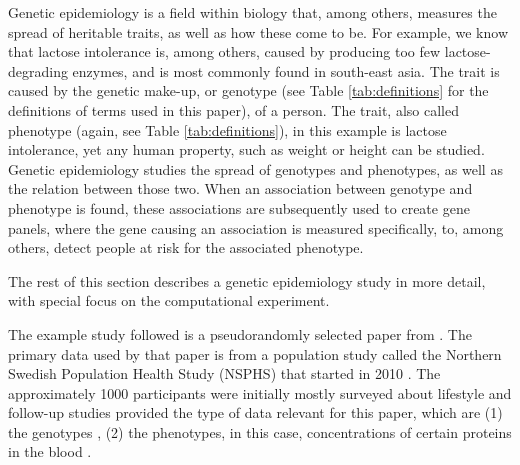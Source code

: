 
Genetic epidemiology is a field within biology that, among 
others, measures the spread of heritable traits,
as well as how these come to be.
For example, we know that lactose intolerance is, among others,
caused by producing too few lactose-degrading enzymes,
and is most commonly found in south-east asia.
The trait is caused by the genetic make-up, 
or genotype 
(see Table \ref{tab:definitions} for the definitions of terms used in this paper), 
of a person.
The trait, also called phenotype (again, see Table \ref{tab:definitions}), 
in this example is lactose intolerance,
yet any human property, such as weight or height can be studied.
Genetic epidemiology studies the spread of genotypes and phenotypes,
as well as the relation between those two.
When an association between genotype and phenotype is found,
these associations are subsequently used to 
create gene panels, where the gene causing 
an association is measured specifically, to, among others,
detect people at risk for the associated phenotype.

The rest of this section describes a genetic epidemiology study 
in more detail, with special focus on the computational experiment.

The example study followed is a pseudorandomly selected paper
from \cite{ahsan2017relative}. The primary data used by that paper is
from a population study called the Northern Swedish Population
Health Study (NSPHS) that started in 2010 \cite{igl2010northern}. 
The approximately 1000 participants were initially mostly surveyed
about lifestyle \cite{igl2010northern} and follow-up studies
provided the type of data relevant for this paper, 
which are (1) the genotypes \cite{johansson2013identification},
(2) the phenotypes, in this case, concentrations of certain proteins in the blood \cite{enroth2014strong,enroth2015effect}.

